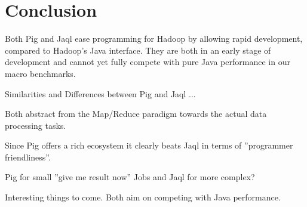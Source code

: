 \section{Conclusion}                      

Both Pig and Jaql ease programming for Hadoop by allowing rapid development, compared to Hadoop's
Java interface. They are both in an early stage of development and cannot yet fully compete with
pure Java performance in our macro benchmarks.
                                                                                                             
Similarities and Differences between Pig and Jaql ... 

Both abstract from the Map/Reduce paradigm towards the actual data processing tasks.

Since Pig offers a rich ecosystem it clearly beats Jaql in terms of  ''programmer friendliness''.

Pig for small ''give me result now'' Jobs and Jaql for more complex?

Interesting things to come. Both aim on competing with Java performance.
